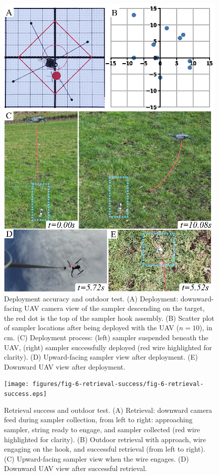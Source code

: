 \begin{figure}[!hpt]
\centering
\includegraphics[width=1\columnwidth]{figures/fig-5-deployment-accuracy/fig-5-deployment-accuracy.eps}
\caption{Deployment accuracy and outdoor test. (A) Deployment: downward-facing UAV camera view of the sampler descending on the target, the red dot is the top of the sampler hook assembly. (B) Scatter plot of sampler locations after being deployed with the UAV ($n=10$), in cm. (C) Deployment process: (left) sampler suspended beneath the UAV, (right) sampler successfully deployed (red wire highlighted for clarity). (D) Upward-facing sampler view after deployment. (E) Downward UAV view after deployment.}
\label{fig-5-deployment-accuracy}
\end{figure}

\begin{figure}[!hpt]
\centering
\texttt{[image: figures/fig-6-retrieval-success/fig-6-retrieval-success.eps]}
\caption{Retrieval success and outdoor test. (A) Retrieval: downward camera feed during sampler collection, from left to right: approaching sampler, string ready to engage, and sampler collected (red wire highlighted for clarity). (B) Outdoor retrieval with approach, wire engaging on the hook, and successful retrieval (from left to right). (C) Upward-facing sampler view when the wire engages. (D) Downward UAV view after successful retrieval.}
\label{fig-6-retrieval-success}
\end{figure}

